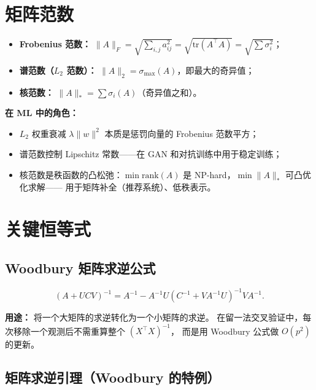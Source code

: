 \section{矩阵范数}

\begin{definition}[常用矩阵范数]
\begin{itemize}
    \item \textbf{Frobenius 范数：} $\displaystyle\|A\|_F = \sqrt{\sum_{i,j} a_{ij}^2} = \sqrt{\mathrm{tr}(A^\top A)} = \sqrt{\sum \sigma_i^2}$；
    \item \textbf{谱范数（$L_2$ 范数）：} $\displaystyle\|A\|_2 = \sigma_{\max}(A)$，即最大的奇异值；
    \item \textbf{核范数：} $\displaystyle\|A\|_* = \sum \sigma_i(A)$（奇异值之和）。
\end{itemize}
\end{definition}

\textbf{在 ML 中的角色：}
\begin{itemize}
    \item $L_2$ 权重衰减 $\lambda \|w\|^2$ 本质是惩罚向量的 Frobenius 范数平方；
    \item 谱范数控制 Lipschitz 常数——在 GAN 和对抗训练中用于稳定训练；
    \item 核范数是秩函数的凸松弛：$\min \mathrm{rank}(A)$ 是 NP-hard，$\min \|A\|_*$ 可凸优化求解——
    用于矩阵补全（推荐系统）、低秩表示。
\end{itemize}

\section{关键恒等式}

\subsection{Woodbury 矩阵求逆公式}

\begin{equation}\label{eq:woodbury}
    (A + U C V)^{-1} = A^{-1} - A^{-1} U (C^{-1} + V A^{-1} U)^{-1} V A^{-1}.
\end{equation}

\textbf{用途：} 将一个大矩阵的求逆转化为一个小矩阵的求逆。
在留一法交叉验证中，每次移除一个观测后不需重算整个 $(X^\top X)^{-1}$，
而是用 Woodbury 公式做 $O(p^2)$ 的更新。

\subsection{矩阵求逆引理（Woodbury 的特例）}

